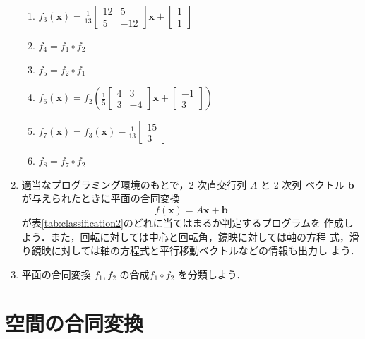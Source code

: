 \documentclass[11pt, uplatex, dvipdfmx, titlepage]{jsarticle}
\newcommand{\ds}{\displaystyle}
\theoremstyle{definition}
\begin{document}
\begin{enumerate}
\begin{enumerate}[(1)]
  \item $\ds f_3(\bm{x})=\frac{1}{13}\left[
      \begin{array}{rr}
        12 & 5\\
        5 & -12
      \end{array}
    \right]\bm{x}+ \left[
      \begin{array}{r}
        1\\
        1
      \end{array}
    \right]$
    
  \item $f_4=f_1 \circ f_2$

  \item $f_5=f_2 \circ f_1$

  \item $\ds f_6(\bm{x}) = f_2\left( \frac{1}{5}\left[
      \begin{array}{rr}
        4 & 3\\
        3 & -4
      \end{array}
    \right] \bm{x} + \left[
      \begin{array}{r}
        -1\\
        3
      \end{array}
    \right]\right)$

  \item $\ds f_7 (\bm{x})= f_3(\bm{x}) - \frac{1}{13}\left[
      \begin{array}{r}
        15\\
        3
      \end{array}
    \right]$

  \item $\ds f_8= f_7 \circ f_2$
  \end{enumerate}

\item 適当なプログラミング環境のもとで，$2$ 次直交行列 $A$ と $2$ 次列
  ベクトル $\bm{b}$ が与えられたときに平面の合同変換
  \[
    f(\bm{x}) = A\bm{x} + \bm{b}
  \]
  が表\ref{tab:classification2}のどれに当てはまるか判定するプログラムを
  作成しよう．また，回転に対しては中心と回転角，鏡映に対しては軸の方程
  式，滑り鏡映に対しては軸の方程式と平行移動ベクトルなどの情報も出力し
  よう．

\item 平面の合同変換 $f_1, f_2$ の合成$f_1 \circ f_2$ を分類しよう．
\end{enumerate}


\newpage

\section{空間の合同変換}\label{sec:3dim}
\end{document}
